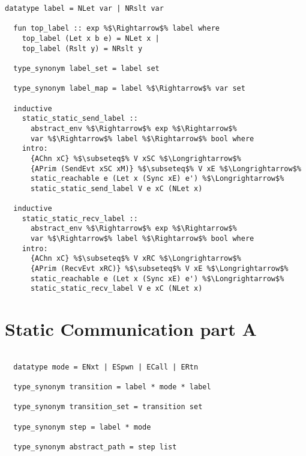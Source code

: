 \begin{lstlisting}[style=codestyle1, escapechar=\%]
  datatype label = NLet var | NRslt var

  fun top_label :: exp %$\Rightarrow$% label where
    top_label (Let x b e) = NLet x |
    top_label (Rslt y) = NRslt y

  type_synonym label_set = label set

  type_synonym label_map = label %$\Rightarrow$% var set

  inductive
    static_static_send_label ::
      abstract_env %$\Rightarrow$% exp %$\Rightarrow$%
      var %$\Rightarrow$% label %$\Rightarrow$% bool where
    intro:
      {AChn xC} %$\subseteq$% V xSC %$\Longrightarrow$%
      {APrim (SendEvt xSC xM)} %$\subseteq$% V xE %$\Longrightarrow$%
      static_reachable e (Let x (Sync xE) e') %$\Longrightarrow$%
      static_static_send_label V e xC (NLet x)

  inductive
    static_static_recv_label ::
      abstract_env %$\Rightarrow$% exp %$\Rightarrow$%
      var %$\Rightarrow$% label %$\Rightarrow$% bool where
    intro:
      {AChn xC} %$\subseteq$% V xRC %$\Longrightarrow$%
      {APrim (RecvEvt xRC)} %$\subseteq$% V xE %$\Longrightarrow$%
      static_reachable e (Let x (Sync xE) e') %$\Longrightarrow$%
      static_static_recv_label V e xC (NLet x)

  \end{lstlisting}

\section{Static Communication part A}
\begin{lstlisting}[style=codestyle1, escapechar=\%]

  datatype mode = ENxt | ESpwn | ECall | ERtn

  type_synonym transition = label * mode * label

  type_synonym transition_set = transition set

  type_synonym step = label * mode

  type_synonym abstract_path = step list
  \end{lstlisting}

